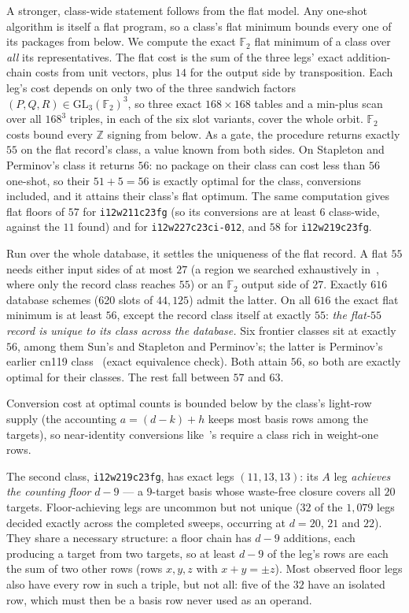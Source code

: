 \documentclass[11pt]{article}
\theoremstyle{definition}
\theoremstyle{remark}
\newcommand{\F}{\mathbb{F}}
\newcommand{\Z}{\mathbb{Z}}
\begin{document}
A stronger, class-wide statement follows from the flat model.  Any
one-shot algorithm is itself a flat program, so a class's flat
minimum bounds every one of its packages from below.  We compute the
exact $\F_2$ flat minimum of a class over \emph{all} its
representatives.  The flat cost is the sum of the three legs' exact
addition-chain costs from unit vectors, plus $14$ for the output side
by transposition.  Each leg's cost depends on only two of the three
sandwich factors $(P,Q,R)\in\mathrm{GL}_3(\F_2)^3$, so three exact
$168\times168$ tables and a min-plus scan over all $168^3$ triples,
in each of the six slot variants, cover the whole orbit.  $\F_2$ costs
bound every $\Z$ signing from below.  As a gate, the procedure
returns exactly $55$ on the flat record's class, a value known from
both sides.  On Stapleton and Perminov's class it returns $56$: no
package on their class can cost less than $56$ one-shot, so their
$51+5=56$ is exactly optimal for the class, conversions included, and
it attains their class's flat optimum.  The same computation gives
flat floors of $57$ for \texttt{i12w211c23fg} (so its conversions are
at least $6$ class-wide, against the $11$ found) and for
\texttt{i12w227c23ci-012}, and $58$ for \texttt{i12w219c23fg}.

Run over the whole database, it settles the uniqueness of the flat
record.  A flat $55$ needs either input sides of at most $27$ (a
region we searched exhaustively in~\cite{Sidebottom26}, where only
the record class reaches $55$) or an $\F_2$ output side of $27$.
Exactly $616$ database schemes (620 slots of $44{,}125$) admit the
latter.  On all $616$ the exact flat minimum is at least $56$, except
the record class itself at exactly $55$: \emph{the flat-$55$ record
is unique to its class across the database.}  Six frontier classes sit at exactly $56$, among them Sun's and
Stapleton and Perminov's; the latter is Perminov's earlier cn119
class~\cite{Perminov25} (exact equivalence check).  Both attain
$56$, so both are exactly optimal for their classes.  The rest
fall between $57$ and $63$.

Conversion cost at optimal
counts is bounded below by the class's light-row supply (the
accounting $a=(d-k)+h$ keeps most basis rows among the targets), so
near-identity conversions like~\cite{SP26}'s require a class rich in
weight-one rows.

The second class, \texttt{i12w219c23fg}, has exact legs
$(11,13,13)$: its $A$ leg \emph{achieves the counting floor} $d-9$ ---
a $9$-target basis whose waste-free closure covers all $20$ targets.
Floor-achieving legs are uncommon but not unique ($32$ of the
$1{,}079$ legs decided exactly across the completed sweeps, occurring
at $d=20$, $21$ and $22$).  They share a necessary structure: a
floor chain has $d-9$ additions, each producing a target from two
targets, so at least $d-9$ of the leg's rows are each the sum of two
other rows (rows $x,y,z$ with $x+y=\pm z$).  Most observed floor legs
also have every row in such a triple, but not all: five of the $32$
have an isolated row, which must then be a basis row never used as an
operand.
\end{document}
